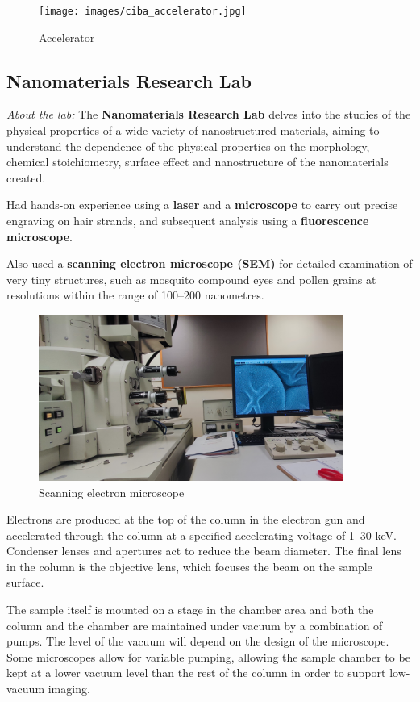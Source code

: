 \documentclass[12pt,a4paper]{article}
\begin{document}
\begin{figure}[H]
    \centering
    \texttt{[image: images/ciba\_accelerator.jpg]}
    \caption{Accelerator}
\end{figure}
\pagebreak

\subsection{Nanomaterials Research Lab}
{\color{red}\textit{About the lab:}} The \textbf{Nanomaterials Research Lab} delves into the studies of the physical properties of a wide variety of nanostructured materials, aiming to understand the dependence of the physical properties on the morphology, chemical stoichiometry, surface effect and nanostructure of the nanomaterials created.

Had hands-on experience using a \textbf{laser} and a \textbf{microscope} to carry out precise engraving on hair strands, and subsequent analysis using a \textbf{fluorescence microscope}.

Also used a \textbf{scanning electron microscope (SEM)} for detailed examination of very tiny structures, such as mosquito compound eyes and pollen grains at resolutions within the range of 100--200 nanometres.

\begin{figure}[H]
    \centering
    \includegraphics[width=10cm]{images/sem.jpg}
    \caption{Scanning electron microscope}
\end{figure}

Electrons are produced at the top of the column in the electron gun and accelerated through the column at a specified accelerating voltage of 1--30 keV. Condenser lenses and apertures act to reduce the beam diameter. The final lens in the column is the objective lens, which focuses the beam on the sample surface.

The sample itself is mounted on a stage in the chamber area and both the column and the chamber are maintained under vacuum by a combination of pumps. The level of the vacuum will depend on the design of the microscope. Some microscopes allow for variable pumping, allowing the sample chamber to be kept at a lower vacuum level than the rest of the column in order to support low-vacuum imaging.
\end{document}

